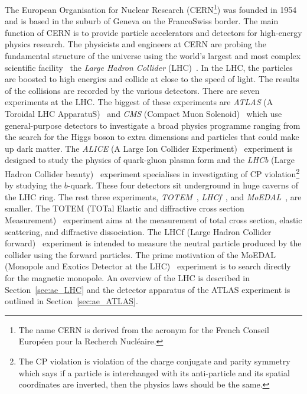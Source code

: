The European Organisation for Nuclear Research (CERN\footnote{The name CERN is derived from the acronym for the French Conseil Europ\'{e}en pour la Recherch Nucl\'{e}aire.}) was founded in 1954 and is based in the suburb of Geneva on the Franco\textendash Swiss border.
The main function of CERN is to provide particle accelerators and detectors for high-energy physics research.
The physicists and engineers at CERN are probing the fundamental structure of the universe using the world's largest and most complex scientific facility \textemdash \ the \textit{Large Hadron Collider} (LHC)~\cite{Evans:2008zzb}.
In the LHC, the particles are boosted to high energies and collide at close to the speed of light.
The results of the collisions are recorded by the various detectors.
There are seven experiments at the LHC.
The biggest of these experiments are \textit{ATLAS} (A Toroidal LHC ApparatuS)~\cite{Aad:2008zzm} and \textit{CMS} (Compact Muon Solenoid)~\cite{Chatrchyan:2008aa} which use general-purpose detectors to investigate a broad physics programme ranging from the search for the Higgs boson to extra dimensions and particles that could make up dark matter.
The \textit{ALICE} (A Large Ion Collider Experiment)~\cite{Aamodt:2008zz} experiment is designed to study the physics of quark-gluon plasma form and the \textit{LHCb} (Large Hadron Collider beauty)~\cite{Alves:2008zz} experiment specialises in investigating of CP violation\footnote{The CP violation is violation of the charge conjugate and parity symmetry which says if a particle is interchanged with its anti-particle and its spatial coordinates are inverted, then the physics laws should be the same.} by studying the $b$-quark.
These four detectors sit underground in huge caverns of the LHC ring.
The rest three experiments, \textit{TOTEM}~\cite{Anelli:2008zza}, \textit{LHCf}~\cite{Adriani:2008zz}, and \textit{MoEDAL}~\cite{Pinfold:2009oia}, are smaller.
The TOTEM (TOTal Elastic and diffractive cross section Measurement)~\cite{Anelli:2008zza} experiment aims at the measurement of total cross section, elastic scattering, and diffractive dissociation.
The LHCf (Large Hadron Collider forward)~\cite{Adriani:2008zz} experiment is intended to measure the neutral particle produced by the collider using the forward particles.
The prime motivation of the MoEDAL (Monopole and Exotics Detector at the LHC)~\cite{Pinfold:2009oia} experiment is to search directly for the magnetic monopole.
An overview of the LHC is described in Section~\ref{sec:ae_LHC} and the detector apparatus of the ATLAS experiment is outlined in Section~\ref{sec:ae_ATLAS}.


